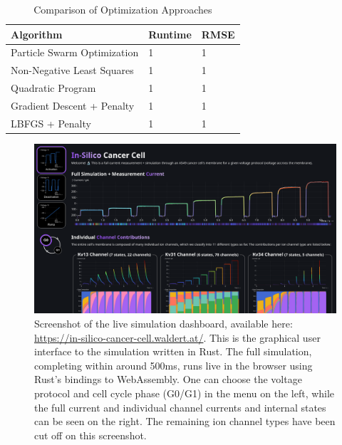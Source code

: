 \documentclass[USenglish,twocolumn]{article}
\begin{document}
  \begin{table}
    \caption{Comparison of Optimization Approaches}
    \begin{tabular}{lll}
      \textbf{Algorithm}                          & \textbf{Runtime} & \textbf{RMSE} \\
      \midrule
      Particle Swarm Optimization                 & 1                & 1             \\
      Non-Negative Least Squares \cite{1997-nnls} & 1                & 1             \\
      Quadratic Program                           & 1                & 1             \\
      Gradient Descent + Penalty                  & 1                & 1             \\
      LBFGS + Penalty                             & 1                & 1             \\
    \end{tabular}
    \label{table:optimization-comparison}
  \end{table}

  \begin{figure}[h]
    \includegraphics[width=\textwidth]{../figures/above-the-fold-screenshot.png}
    \caption{Screenshot of the live simulation dashboard, available here: \url{https://in-silico-cancer-cell.waldert.at/}. This is the graphical user interface to the simulation written in Rust. The full simulation, completing within around 500ms, runs live in the browser using Rust's bindings to WebAssembly. One can choose the voltage protocol and cell cycle phase (G0/G1) in the menu on the left, while the full current and individual channel currents and internal states can be seen on the right. The remaining ion channel types have been cut off on this screenshot.}
    \label{figure:screenshot}
  \end{figure}
\end{document}
